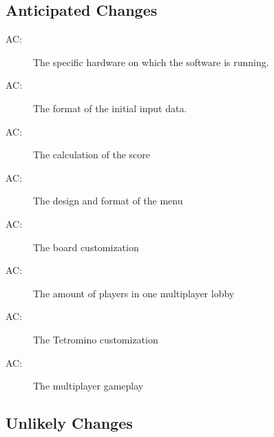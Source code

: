 \documentclass[12pt, titlepage]{article}
\newcounter{acnum}
\newcommand{\actheacnum}{AC\theacnum}
\begin{document}
\subsection{Anticipated Changes} \label{SecAchange}


\begin{description}
\item[ \actheacnum \label{acHardware}:] The specific
  hardware on which the software is running.
\item[ \actheacnum \label{acInput}:] The format of the
  initial input data.
\item[ \actheacnum \label{acScore}:] The calculation of the score
\item[ \actheacnum \label{acMenu}:] The design and format of the menu
\item[ \actheacnum \label{acBoard}:] The board customization
\item[ \actheacnum \label{acMulti}:] The amount of players in one multiplayer lobby
\item[ \actheacnum \label{acCustomize}:] The Tetromino customization
\item[ \actheacnum \label{acGameplay}:] The multiplayer gameplay 
\end{description}

\subsection{Unlikely Changes} \label{SecUchange}
\end{document}
